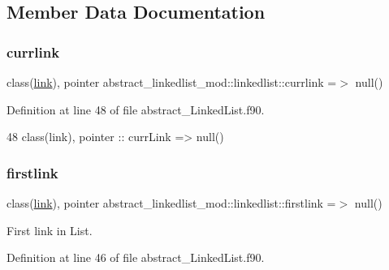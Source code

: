 \subsection{Member Data Documentation}
\mbox{\label{structabstract__linkedlist__mod_1_1linkedlist_a5039a762fe6e50feda0265f14386c478}} 
\subsubsection{\texorpdfstring{currlink}{currlink}}
{\footnotesize\ttfamily class(\mbox{\hyperlink{structlink__mod_1_1link}{link}}), pointer abstract\+\_\+linkedlist\+\_\+mod\+::linkedlist\+::currlink =$>$ null()\hspace{0.3cm}{\ttfamily [private]}}



Definition at line 48 of file abstract\+\_\+\+Linked\+List.\+f90.


\begin{DoxyCode}
48         \textcolor{keywordtype}{class}(link), \textcolor{keywordtype}{pointer} :: currLink => null()
\end{DoxyCode}
\mbox{\label{structabstract__linkedlist__mod_1_1linkedlist_a1db1fbb6e3acfb39a2cab68396f31867}} 
\subsubsection{\texorpdfstring{firstlink}{firstlink}}
{\footnotesize\ttfamily class(\mbox{\hyperlink{structlink__mod_1_1link}{link}}), pointer abstract\+\_\+linkedlist\+\_\+mod\+::linkedlist\+::firstlink =$>$ null()\hspace{0.3cm}{\ttfamily [private]}}



First link in List. 



Definition at line 46 of file abstract\+\_\+\+Linked\+List.\+f90.


